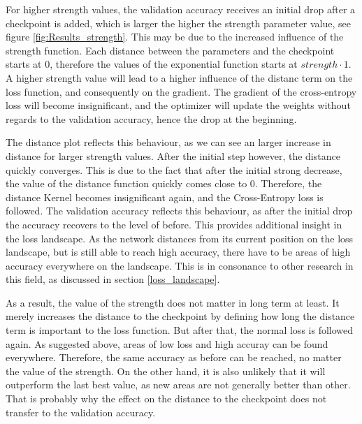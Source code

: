 For higher strength values, the validation accuracy receives an initial drop
after a checkpoint is added, which is larger the higher the strength parameter
value, see figure \ref{fig:Results_strength}. This may be due to the increased
influence of the strength function. Each distance between the parameters and the
checkpoint starts at 0, therefore the values of the exponential function starts
at $strength \cdot 1$. A higher strength value will lead to a higher influence
of the distanc term on the loss function, and consequently on the gradient. The
gradient of the cross-entropy loss will become insignificant, and the optimizer
will update the weights without regards to the validation accuracy, hence the
drop at the beginning. 

The distance plot reflects this behaviour, as we can see an larger increase in
distance for larger strength values. After the initial step however, the
distance quickly converges. This is due to the fact that after the initial
strong decrease, the value of the distance function quickly comes close to 0.
Therefore, the distance Kernel becomes insignificant again, and the
Cross-Entropy loss is followed. The validation accuracy reflects this behaviour,
as after the initial drop the accuracy recovers to the level of before. This
provides additional insight in the loss landscape. As the network distances from
its current position on the loss landscape, but is still able to reach high
accuracy, there have to be areas of high accuracy everywhere on the landscape.
This is in consonance to other research in this field, as discussed in section
\ref{loss_landscape}.

As a result, the value of the strength does not matter in long term at least. It
merely increases the distance to the checkpoint by defining how long the
distance term is important to the loss function. But after that, the normal loss
is followed again. As suggested above, areas of low loss and high accuray can
be found everywhere. Therefore, the same accuracy as before can be reached, no
matter the value of the strength. On the other hand, it is also unlikely that it
will outperform the last best value, as new areas are not generally better than
other. That is probably why the effect on the distance to the checkpoint does
not transfer to the validation accuracy.





